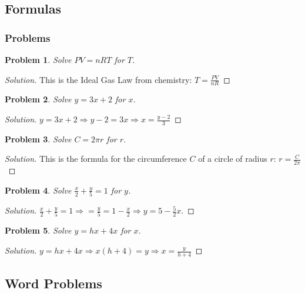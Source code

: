 \documentclass{article}
\theoremstyle{mystyle}
\newtheorem{problem}{Problem}[section]
\begin{document}
\subsection{Formulas}
\subsubsection{Problems}
\begin{problem}
Solve $PV = nRT$ for $T$.
\end{problem}
\begin{proof}[Solution]
This is the Ideal Gas Law from chemistry: $\boxed{T = \tfrac{PV}{nR}}$
\end{proof}
\begin{problem}
Solve $y=3x+2$ for $x$.
\end{problem}
\begin{proof}[Solution]
$y = 3x+2 \Rightarrow y-2 = 3x \Rightarrow \boxed{x =  \tfrac{y-2}{3}}$
\end{proof}
\begin{problem}
Solve $C = 2\pi r$ for $r$.
\end{problem}
\begin{proof}[Solution]
This is the formula for the circumference $C$ of a circle of radius $r$: $\boxed{r = \tfrac{C}{2\pi}}$
\end{proof}
\begin{problem}
Solve $\tfrac{x}{2}+\tfrac{y}{5} = 1$ for $y$.
\end{problem}
\begin{proof}[Solution]
$\tfrac{x}{2}+\tfrac{y}{5}=1\Rightarrow=\tfrac{y}{5}=1-\tfrac{x}{2}\Rightarrow\boxed{y=5-\tfrac{5}{2}x}$.
\end{proof}
\begin{problem}
Solve $y=hx+4x$ for $x$.
\end{problem}
\begin{proof}[Solution]
$y = hx+4x \Rightarrow x(h+4) = y \Rightarrow \boxed{x= \tfrac{y}{h+4}}$
\end{proof}
\subsection{Word Problems}
\end{document}
